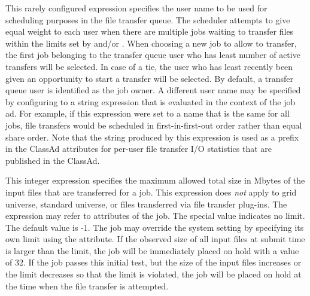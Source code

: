\begin{description}
\label{param:TransferQueueUserExpr}
\item[\Macro{TRANSFER\_QUEUE\_USER\_EXPR}]
  This rarely configured expression specifies the user name to be used
  for scheduling purposes in the file transfer queue.  The scheduler
  attempts to give equal weight to each user when there are multiple
  jobs waiting to transfer files within the limits set by
   and/or
  .  When choosing a new job to
  allow to transfer, the first job belonging to the transfer queue
  user who has least number of active transfers will be selected.
  In case of a tie, the user who has least recently been given an
  opportunity to start a transfer will be selected.  By default, a
  transfer queue user is identified as the job owner.  A different
  user name may be specified by configuring
   to a string expression that is
  evaluated in the context of the job ad.  For example, if this
  expression were set to a name that is the same for all jobs, file
  transfers would be scheduled in first-in-first-out order rather than
  equal share order.  Note that the string produced by this expression
  is used as a prefix in the ClassAd attributes for per-user file
  transfer I/O statistics that are published in the 
  ClassAd.

\label{param:MaxTransferInputMB}
\item[\Macro{MAX\_TRANSFER\_INPUT\_MB}]
  This integer expression specifies the maximum allowed total size in
  Mbytes of the input files that are transferred for a job.  This
  expression does \emph{not} apply to grid universe, standard universe, or
  files transferred via file transfer plug-ins.  The expression may
  refer to attributes of the job.  
  The special value  indicates no limit.
  The default value is -1.
  The job may override the system setting
  by specifying its own limit using the 
  attribute.  
  If the observed size of all input files at submit time
  is larger than the limit, the job will be immediately placed on hold
  with a  value of 32.
  If the job passes this initial test, but the
  size of the input files increases or the limit decreases so that the
  limit is violated, the job will be placed on hold at the time when
  the file transfer is attempted.


\end{description}
